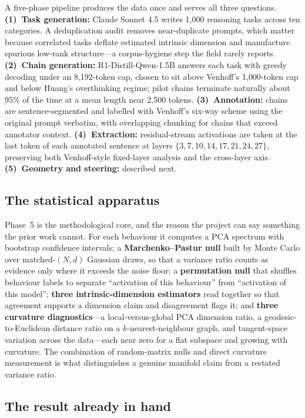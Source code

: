 \documentclass[10pt]{article}
\begin{document}
A five-phase pipeline produces the data once and serves all three questions.
\textbf{(1)~Task generation:} Claude Sonnet 4.5 writes 1{,}000 reasoning tasks
across ten categories. A deduplication audit removes near-duplicate prompts, which
matter because correlated tasks deflate estimated intrinsic dimension and
manufacture spurious low-rank structure---a corpus-hygiene step the field rarely
reports. \textbf{(2)~Chain generation:} R1-Distill-Qwen-1.5B answers each task with
greedy decoding under an 8{,}192-token cap, chosen to sit above Venhoff's
1{,}000-token cap and below Huang's overthinking regime; pilot chains terminate
naturally about 95\% of the time at a mean length near 2{,}500 tokens.
\textbf{(3)~Annotation:} chains are sentence-segmented and labelled with Venhoff's
six-way scheme using the original prompt verbatim, with overlapping chunking for
chains that exceed annotator context. \textbf{(4)~Extraction:} residual-stream
activations are taken at the last token of each annotated sentence at layers
$\{3,7,10,14,17,21,24,27\}$, preserving both Venhoff-style fixed-layer analysis and
the cross-layer axis. \textbf{(5)~Geometry and steering:} described next.

\subsection{The statistical apparatus}

Phase~5 is the methodological core, and the reason the project can say something
the prior work cannot. For each behaviour it computes a PCA spectrum with bootstrap
confidence intervals; a \textbf{Marchenko--Pastur null} built by Monte Carlo over
matched-$(N,d)$ Gaussian draws, so that a variance ratio counts as evidence only
where it exceeds the noise floor; a \textbf{permutation null} that shuffles
behaviour labels to separate ``activation of this behaviour'' from ``activation of
this model''; \textbf{three intrinsic-dimension estimators} read together so that
agreement supports a dimension claim and disagreement flags it; and \textbf{three
curvature diagnostics}---a local-versus-global PCA dimension ratio, a
geodesic-to-Euclidean distance ratio on a $k$-nearest-neighbour graph, and
tangent-space variation across the data---each near zero for a flat subspace and
growing with curvature. The combination of random-matrix nulls and direct curvature
measurement is what distinguishes a genuine manifold claim from a restated variance
ratio.

\subsection{The result already in hand}
\end{document}
